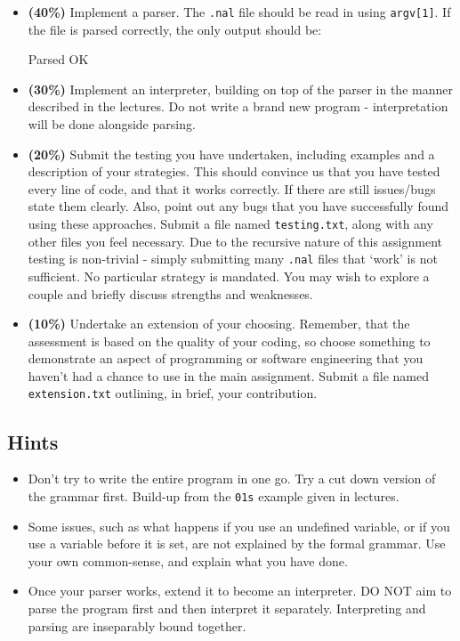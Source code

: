 
\begin{exercise}
\begin{itemize}

\strut

\item {\bf (40\%)}
Implement a parser. The \verb^.nal^ file should be read in using
\verb^argv[1]^.  If the file is parsed correctly, the only output should
be:
\begin{terminaloutput}
Parsed OK
\end{terminaloutput}

\item {\bf (30\%)}
Implement an interpreter, building on top of the parser in the
manner described in the lectures. Do not write a brand new program -
interpretation will be done alongside parsing.

\item {\bf (20\%)}
Submit the testing you have undertaken, including examples and a
description of your strategies. This should convince us that you have
tested every line of code, and that it works correctly. If there are
still issues/bugs state them clearly. Also, point out any bugs that
you have successfully found using these approaches. Submit a file named
\verb^testing.txt^, along with any other files you feel necessary. Due
to the recursive nature of this assignment testing is non-trivial -
simply submitting many \verb^.nal^ files that `work' is not sufficient.
No particular strategy is mandated. You may wish to explore a couple
and briefly discuss strengths and weaknesses.

\item {\bf (10\%)}
Undertake an extension of your choosing.  Remember, that the assessment is
based on the quality of your coding, so choose something to demonstrate
an aspect of programming or software engineering that you haven't
had a chance to use in the main assignment. Submit a file named
\verb^extension.txt^ outlining, in brief, your contribution.
\end{itemize}

\subsection*{Hints}
\begin{itemize}
\item Don't try to write the entire program in one go. Try a cut
down version of the grammar first. Build-up from the \verb^01s^
example given in lectures.
\item Some issues, such as what happens if you use an undefined variable,
or if you use a variable before it is set, are not explained by the formal
grammar. Use your own common-sense, and explain what you have done.
\item Once your parser works, extend it to become an interpreter. DO NOT
aim to parse the program first and then interpret it separately.
Interpreting and parsing are inseparably bound together.
\end{itemize}
 

\end{exercise}
